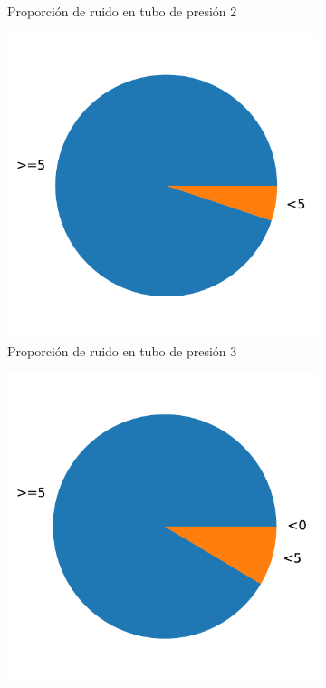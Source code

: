 \documentclass[a4paper,12pt,twoside,oldfontcommands]{memoir}
\begin{document}
\begin{figure}
\begin{subfigure}[b]{0.45\textwidth}
		\caption{Proporción de ruido en tubo de presión 2}
		\label{fig:p2_ruido}
	\end{subfigure}
	\begin{subfigure}[b]{0.45\textwidth}
		\includegraphics[width=\textwidth]{images/ruido/p3-ruido}
		\caption{Proporción de ruido en tubo de presión 3}
		\label{fig:p3_ruido}
	\end{subfigure}
	\begin{subfigure}[b]{0.45\textwidth}
		\includegraphics[width=\textwidth]{images/ruido/p4-ruido}

\end{subfigure}
\end{figure}
\end{document}
